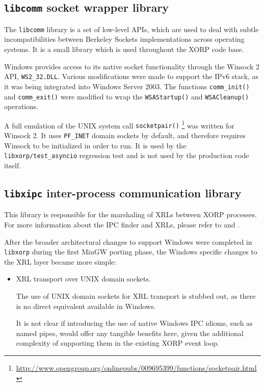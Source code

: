 \documentclass[11pt]{article}
\begin{document}
{%
\subsection{{\tt libcomm} socket wrapper library}

The {\tt libcomm} library is a set of low-level APIs, which are used to deal
with subtle incompatibilities between Berkeley Sockets implementations
across operating systems. It is a small library which is used throughout
the XORP code base.

Windows provides access to its native socket functionality through
the Winsock 2 API, {\tt WS2\_32.DLL}. Various modifications were made to
support the IPv6 stack, as it was being integrated into Windows Server 2003.
The functions {\tt comm\_init()} and {\tt comm\_exit()} were modified to wrap the
{\tt WSAStartup()} and {\tt WSACleanup()} operations.

A full emulation of the UNIX system call {\tt socketpair()}
\footnote{\url{http://www.opengroup.org/onlinepubs/009695399/functions/socketpair.html}}
was written for Winsock 2. It uses {\tt PF\_INET} domain sockets by default, and therefore
requires Winsock to be initialized in order to run.
It is used by the {\tt libxorp/test\_asyncio} regression
test and is not used by the production code itself.

\subsection{{\tt libxipc} inter-process communication library}

This library is responsible for the marshaling of XRLs between XORP processes.
For more information about the IPC finder and XRLs, please refer to
\cite{xorp:xrl} and \cite{xorp:xrl_interfaces}.

After the broader architectural changes to support Windows were completed
in {\tt libxorp} during the first MinGW porting phase, the Windows specific changes
to the XRL layer became more simple:
\begin{itemize}
 \item XRL transport over UNIX domain sockets.

The use of UNIX domain sockets for XRL transport is stubbed out,
as there is no direct equivalent available in Windows.

It is not clear if introducing the use of native Windows IPC idioms,
such as named pipes, would offer any tangible benefits here, given
the additional complexity
of supporting them in the existing XORP event loop.


\end{itemize}}
\end{document}
